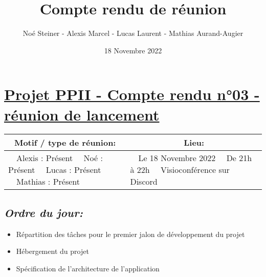 \documentclass[french,a4paper]{article}
\author{Noé Steiner - Alexis Marcel - Lucas Laurent - Mathias Aurand-Augier}
\date{18 Novembre 2022}
\newcommand{\tabitem}{\textbullet~~}\title{Compte rendu de réunion}
\begin{document}
\maketitle

\section*{\underline{Projet PPII - Compte rendu n°03 - réunion de lancement}}

\begin{table}[!htb]
  \centering
  \begin{tabular}{| p{7cm} | p{7cm} |}
    \hline
    \multicolumn{1}{|c|}{ Motif / type de réunion:} & \multicolumn{1}{c|}{Lieu:} \\
    \hline
    \tabitem Alexis : Présent\newline
    \tabitem Noé : Présent\newline
    \tabitem Lucas : Présent\newline
    \tabitem Mathias : Présent                      &
    \tabitem Le 18 Novembre 2022\newline
    \tabitem De 21h à 22h\newline
    \tabitem Visioconférence sur Discord                                         \\
    \hline
  \end{tabular}
\end{table}

\subsection*{\textit{Ordre du jour:}}

\begin{itemize}
  \item Répartition des tâches pour le premier jalon de développement du projet
  \item Hébergement du projet
  \item Spécification de l'architecture de l'application
\end{itemize}
\end{document}
